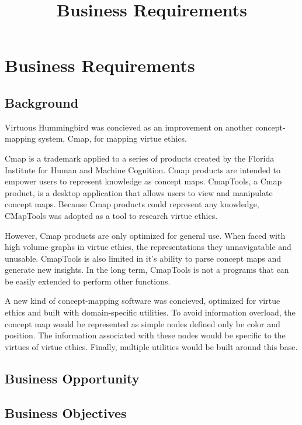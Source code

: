 \documentclass{article}
\title{Business Requirements}
\begin{document}
    
\maketitle

\section{Business Requirements}

\subsection{Background}

Virtuous Hummingbird was concieved as an improvement on another concept-mapping system, Cmap, for mapping virtue ethics.

Cmap is a trademark applied to a series of products created by the Florida Institute for Human and Machine Cognition.
Cmap products are intended to empower users to represent knowledge as concept maps.
CmapTools, a Cmap product, is a desktop application that allows users to view and manipulate concept maps.
Because Cmap products could represent any knowledge, CMapTools was adopted as a tool to research virtue ethics.

However, Cmap products are only optimized for general use.
When faced with high volume graphs in virtue ethics, the representations they unnavigatable and unusable.
CmapTools is also limited in it's ability to parse concept maps and generate new insights.
In the long term, CmapTools is not a programs that can be easily extended to perform other functions.

A new kind of concept-mapping software was concieved, optimized for virtue ethics and built with domain-specific utilities.
To avoid information overload, the concept map would be represented as simple nodes defined only be color and position.
The information associated with these nodes would be specific to the virtues of virtue ethics.
Finally, multiple utilities would be built around this base.

\subsection{Business Opportunity}

\subsection{Business Objectives}
\end{document}
